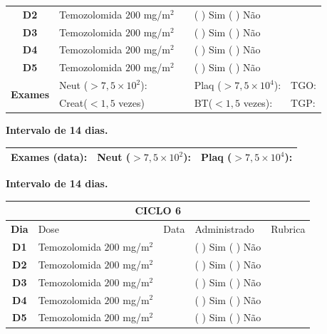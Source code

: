 \documentclass[11pt,a4paper,oldfontcommands]{memoir}
\begin{document}
\begin{center}
\begin{table}[H]
\begin{tabular}{p{1cm}p{5cm}|p{1cm}|p{4.5cm}|p{2cm}}
    \multicolumn{1}{c|}{\multirow{1}{*}{\textbf{D2}}}&{Temozolomida \(200\) mg/m\(^2\)}&&{(  ) Sim (  ) Não}&\\
    \multicolumn{1}{c|}{\multirow{1}{*}{\textbf{D3}}}&{Temozolomida \(200\) mg/m\(^2\)}&&{(  ) Sim (  ) Não}&\\
    \multicolumn{1}{c|}{\multirow{1}{*}{\textbf{D4}}}&{Temozolomida \(200\) mg/m\(^2\)}&&{(  ) Sim (  ) Não}&\\
    \multicolumn{1}{c|}{\multirow{1}{*}{\textbf{D5}}}&{Temozolomida \(200\) mg/m\(^2\)}&&{(  ) Sim (  ) Não}&\\
    \hline
    \multicolumn{1}{c|}{\multirow{2}{*}{\textbf{Exames}}}&\multicolumn{2}{l|}{Neut (\(>7,5\times10^2\)):}&{Plaq (\(>7,5\times10^4\)):}&{TGO:}\\
    \cline{2-5}
    \multicolumn{1}{c|}{\multirow{2}{*}{{}}}&\multicolumn{2}{l|}{Creat(\(<1,5\) vezes)}&{BT(\(<1,5\) vezes):}&{TGP:}
    \\
    \hline
\end{tabular}
\end{table}
\textbf{Intervalo de 14 dias.}
\begin{table}[H]
\begin{tabular}{p{5cm}|p{5cm}|p{4.7cm}}
    \hline
    \textbf{Exames (data):}&{Neut (\(>7,5\times10^2\)):}&{Plaq (\(>7,5\times10^4\)):}
    \\
    \hline
\end{tabular}
\end{table}
\textbf{Intervalo de 14 dias.}
\begin{table}[H]
\begin{tabular}{p{1cm}p{5cm}|p{1cm}|p{4.5cm}|p{2cm}}
	\hline
	\multicolumn{5}{c}{\textbf{CICLO 6}}\\
\hline
    \multicolumn{1}{c|}{\multirow{1}{*}{\textbf{Dia}}}&{Dose}&{Data}&{Administrado}&{Rubrica} \\
    \hline
    \multicolumn{1}{c|}{\multirow{1}{*}{\textbf{D1}}}&{Temozolomida \(200\) mg/m\(^2\)}&&{(  ) Sim (  ) Não}&\\
    \multicolumn{1}{c|}{\multirow{1}{*}{\textbf{D2}}}&{Temozolomida \(200\) mg/m\(^2\)}&&{(  ) Sim (  ) Não}&\\
    \multicolumn{1}{c|}{\multirow{1}{*}{\textbf{D3}}}&{Temozolomida \(200\) mg/m\(^2\)}&&{(  ) Sim (  ) Não}&\\
    \multicolumn{1}{c|}{\multirow{1}{*}{\textbf{D4}}}&{Temozolomida \(200\) mg/m\(^2\)}&&{(  ) Sim (  ) Não}&\\
    \multicolumn{1}{c|}{\multirow{1}{*}{\textbf{D5}}}&{Temozolomida \(200\) mg/m\(^2\)}&&{(  ) Sim (  ) Não}&\\

\end{tabular}
\end{table}
\end{center}
\end{document}
